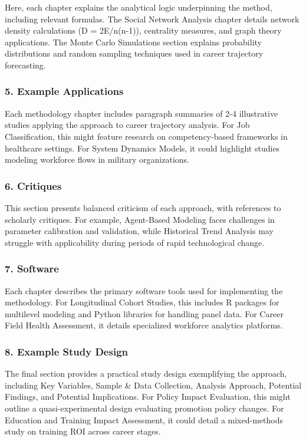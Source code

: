 \documentclass[./main.tex]{subfiles}
\begin{document}
Here, each chapter explains the analytical logic underpinning the
method, including relevant formulas. The Social Network Analysis chapter
details network density calculations (D = 2E/n(n-1)), centrality
measures, and graph theory applications. The Monte Carlo Simulations
section explains probability distributions and random sampling
techniques used in career trajectory forecasting.

\subsubsection{5. Example Applications}\label{example-applications}

Each methodology chapter includes paragraph summaries of 2-4
illustrative studies applying the approach to career trajectory
analysis. For Job Classification, this might feature research on
competency-based frameworks in healthcare settings. For System Dynamics
Models, it could highlight studies modeling workforce flows in military
organizations.

\subsubsection{6. Critiques}\label{critiques}

This section presents balanced criticism of each approach, with
references to scholarly critiques. For example, Agent-Based Modeling
faces challenges in parameter calibration and validation, while
Historical Trend Analysis may struggle with applicability during periods
of rapid technological change.

\subsubsection{7. Software}\label{software}

Each chapter describes the primary software tools used for implementing
the methodology. For Longitudinal Cohort Studies, this includes R
packages for multilevel modeling and Python libraries for handling panel
data. For Career Field Health Assessment, it details specialized
workforce analytics platforms.

\subsubsection{8. Example Study Design}\label{example-study-design}

The final section provides a practical study design exemplifying the
approach, including Key Variables, Sample \& Data Collection, Analysis
Approach, Potential Findings, and Potential Implications. For Policy
Impact Evaluation, this might outline a quasi-experimental design
evaluating promotion policy changes. For Education and Training Impact
Assessment, it could detail a mixed-methods study on training ROI across
career stages.
\end{document}
